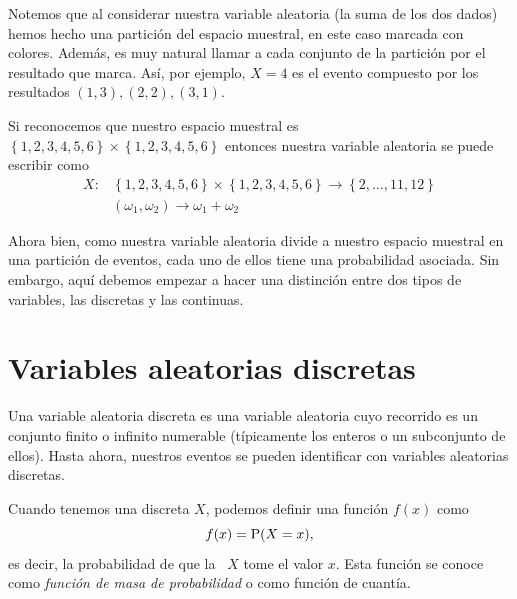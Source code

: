 Notemos que al considerar nuestra variable aleatoria (la suma de los dos dados) hemos hecho una partición del espacio muestral, en este caso marcada con colores. Además, es muy natural llamar a cada conjunto de la partición por el resultado que marca. Así, por ejemplo, \(X=4\) es el evento compuesto por los resultados \((1, 3), (2, 2), (3, 1)\). 

\begin{figure}
\end{figure}

\formal
Si reconocemos que nuestro espacio muestral es \(\left\{ 1, 2, 3, 4, 5, 6 \right\} \times \left\{ 1, 2, 3, 4, 5, 6 \right\}\) entonces nuestra variable aleatoria se puede escribir como
\begin{align*}
    X: & \left\{ 1, 2, 3, 4, 5, 6 \right\} \times \left\{1,  2, 3, 4, 5, 6 \right\} \rightarrow \left\{ 2, \ldots, 11, 12 \right\}\\
    & (\omega_1, \omega_2) \to \omega_1 + \omega_2
\end{align*}

\informal
Ahora bien, como nuestra variable aleatoria divide a nuestro espacio muestral en una partición de eventos, cada uno de ellos tiene una probabilidad asociada. Sin embargo, aquí debemos empezar a hacer una distinción entre dos tipos de variables, las discretas y las continuas.

\section{Variables aleatorias discretas}

Una variable aleatoria discreta es una variable aleatoria cuyo recorrido es un conjunto finito o infinito numerable (típicamente los enteros o un subconjunto de ellos). Hasta ahora, nuestros eventos se pueden identificar con variables aleatorias discretas. 

Cuando tenemos una \va{} discreta \(X\), podemos definir una función \(f(x)\) como \[f(x) = \operatorname{P}(X=x),\] es decir, la probabilidad de que la \va\ \(X\) tome el valor \(x\). Esta función se conoce como \emph{función de masa de probabilidad} o como función de cuantía.

